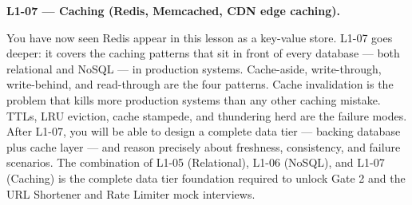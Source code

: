 \documentclass[11pt,a4paper]{article}
\begin{document}
\begin{insightbox}
\textbf{L1-07 --- Caching (Redis, Memcached, CDN edge caching).}

You have now seen Redis appear in this lesson as a key-value store. L1-07 goes deeper: it covers the caching patterns that sit in front of every database --- both relational and NoSQL --- in production systems. Cache-aside, write-through, write-behind, and read-through are the four patterns. Cache invalidation is the problem that kills more production systems than any other caching mistake. TTLs, LRU eviction, cache stampede, and thundering herd are the failure modes. After L1-07, you will be able to design a complete data tier --- backing database plus cache layer --- and reason precisely about freshness, consistency, and failure scenarios. The combination of L1-05 (Relational), L1-06 (NoSQL), and L1-07 (Caching) is the complete data tier foundation required to unlock Gate 2 and the URL Shortener and Rate Limiter mock interviews.
\end{insightbox}
\end{document}
